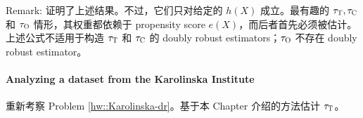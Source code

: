 Remark: 
\citet{tao2019doubly} 证明了上述结果。不过，它们只对给定的 $h(X)$ 成立。最有趣的 $\tau_\textsc{T}, \tau_\textsc{C}$ 和 $\tau_\textsc{O}$ 情形，其权重都依赖于 propensity score $e(X)$，而后者首先必须被估计。上述公式不适用于构造 $\tau_\textsc{T}$ 和 $\tau_\textsc{C}$ 的 doubly robust estimators；$\tau_\textsc{O}$ 不存在 doubly robust estimator。


\paragraph{Analyzing a dataset from the Karolinska Institute}\label{hw::Karolinska-att}

重新考察 Problem \ref{hw::Karolinska-dr}。基于本 Chapter 介绍的方法估计 $\tau_\textsc{T}$。
